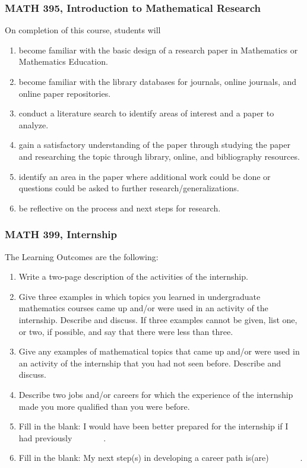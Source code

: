 \documentclass[11pt]{article}
\newenvironment{alphalist}{
\begin{enumerate}[label=(\arabic*),widest=107 ,leftmargin=25pt, itemsep=0pt]}
{\end{enumerate}}
\begin{document}
\subsubsection{MATH 395, Introduction to Mathematical Research}

On completion of this course, students will 
\begin{alphalist}
\item  become familiar with the basic design of a research paper in Mathematics or Mathematics Education.
\item become familiar with the library databases for journals, online journals, and online paper repositories.
\item conduct a literature search to identify areas of interest and a paper to analyze.
\item  gain a satisfactory understanding of the paper through studying the paper and researching the topic through
library, online, and bibliography resources.
\item  identify an area in the paper where additional work could be done or questions could be asked to further
research/generalizations.
\item  be reflective on the process and next steps for research.
\end{alphalist}

\subsubsection{MATH 399, Internship}
The Learning Outcomes are the following:
\begin{alphalist}
    \item Write a two-page description of the activities of the 
    internship.
    \item Give three examples in which topics you learned in 
    undergraduate mathematics courses came up and/or were used in an 
    activity of the internship. Describe and discuss. 
    If three examples cannot be given, list one, or two, if possible, 
    and say that there were less than three.
    \item Give any examples of mathematical topics that came up 
    and/or were used in an activity of the internship that you had 
    not seen before. Describe and discuss. 
    \item Describe two jobs and/or careers for which the experience 
    of the internship made you more qualified than you were before.
    \item Fill in the blank: I would have been better prepared for 
    the internship if I had previously \underline{$\phantom{xxxxxx}$}.
    \item Fill in the blank: My next step(s) in developing a career path is(are) 
    \underline{$\phantom{xxxxxx}$}.
\end{alphalist}
\end{document}
